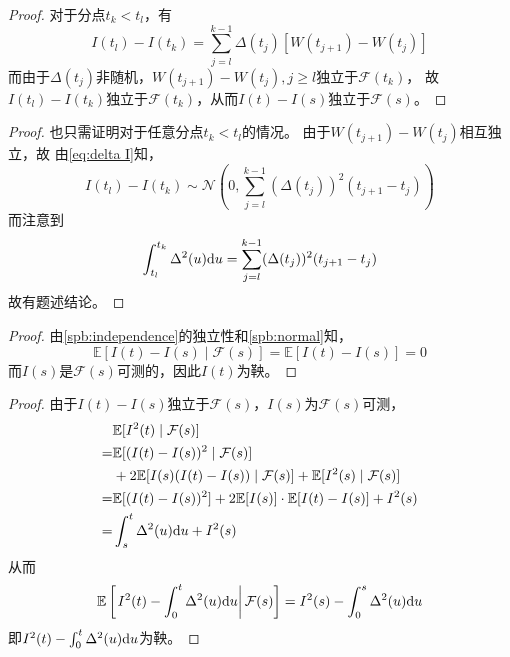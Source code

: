 \documentclass[cn]{homework}
\newcommand{\E}{\mathbb E}
\begin{document}
    \problem[习题4.2]
    \begin{subproblem}
        \item
        \label{spb:independence}
        \begin{proof}
            对于分点$t_k<t_l$，有
            \begin{equation}
                \label{eq:delta I}
                I(t_l)-I(t_k)=\sum_{j=l}^{k-1}\Delta(t_j)[W(t_{j+1})-W(t_j)]
            \end{equation}
            而由于$\Delta(t_j)$非随机，$W(t_{j+1})-W(t_j),j\geq l$独立于$\mathcal F(t_k)$，
            故$I(t_l)-I(t_k)$独立于$\mathcal F(t_k)$，从而$I(t)-I(s)$独立于$\mathcal F(s)$。
        \end{proof}

        \item
        \label{spb:normal}
        \begin{proof}
            也只需证明对于任意分点$t_k<t_l$的情况。
            由于$W(t_{j+1})-W(t_j)$相互独立，故
            由\cref{eq:delta I}知，
            \[I(t_l)-I(t_k)\sim\mathcal N\left(0,\sum_{j=l}^{k-1}(\Delta(t_j))^2(t_{j+1}-t_j)\right)\]
            而注意到
            \[\int_{t_l}^{t_k}\Delta^2(u)\mathrm d u=\sum_{j=l}^{k-1}(\Delta(t_j))^2(t_{j+1}-t_j)\]
            故有题述结论。
        \end{proof}

        \item
        \begin{proof}
            由\ref{spb:independence}的独立性和\ref{spb:normal}知，
            \[\E[I(t)-I(s)\mid\mathcal F(s)]=\E[I(t)-I(s)]=0\]
            而$I(s)$是$\mathcal F(s)$可测的，因此$I(t)$为鞅。
        \end{proof}
        
        \item
        \begin{proof}
            由于$I(t)-I(s)$独立于$\mathcal F(s)$，$I(s)$为$\mathcal F(s)$可测，
            \[\begin{aligned}
                &\E[I^2(t)\mid\mathcal F(s)]\\
                =&\begin{aligned}[t]
                &\E[(I(t)-I(s))^2\mid\mathcal F(s)]\\
                &+2\E[I(s)(I(t)-I(s))\mid\mathcal F(s)]
                +\E[I^2(s)\mid\mathcal F(s)]
                \end{aligned}\\
                =&\E[(I(t)-I(s))^2]+2\E[I(s)]\cdot\E[I(t)-I(s)]
                +I^2(s)\\
                =&\int_s^t\Delta^2(u)\diff u+I^2(s)
            \end{aligned}\]
            从而
            \[\E\left[\left.I^2(t)-\int_0^t\Delta^2(u)\diff u\right|\mathcal F(s)\right]
            =I^2(s)-\int_0^s\Delta^2(u)\diff u\]
            即$I^2(t)-\int_0^t\Delta^2(u)\mathrm d u$为鞅。
        \end{proof}
    \end{subproblem}
\end{document}
